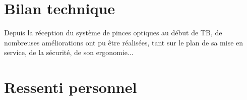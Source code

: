 

\section*{Bilan technique}
Depuis la réception du système de pinces optiques au début de TB, de nombreuses améliorations ont pu être réalisées, tant sur le plan de sa mise en service, de la sécurité, de son ergonomie...
\section*{Ressenti personnel}
\vfil
\hspace{8cm}\makeatletter\@author\makeatother\par
\hspace{8cm}\begin{minipage}{5cm}
    \printsignature
\end{minipage}